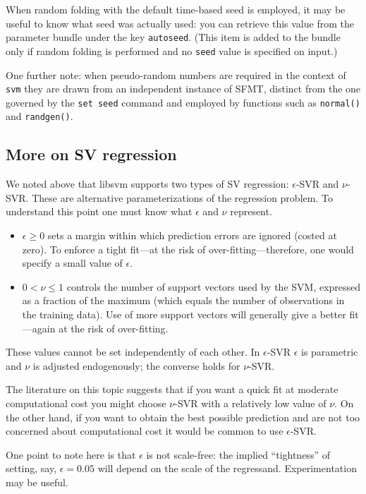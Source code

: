 \documentclass{article}
\begin{document}
When random folding with the default time-based seed is employed, it
may be useful to know what seed was actually used: you can retrieve
this value from the parameter bundle under the key
\texttt{autoseed}. (This item is added to the bundle only if random
folding is performed and no \texttt{seed} value is specified on
input.)

One further note: when pseudo-random numbers are required in the
context of \texttt{svm} they are drawn from an independent instance of
\textsf{SFMT}, distinct from the one governed by the \texttt{set seed}
command and employed by functions such as \texttt{normal()} and
\texttt{randgen()}.

\subsection{More on SV regression}
\label{sec:svr}

We noted above that libsvm supports two types of SV regression:
$\epsilon$-SVR and $\nu$-SVR. These are alternative parameterizations
of the regression problem. To understand this point one must know what
$\epsilon$ and $\nu$ represent.
\begin{itemize}
\item $\epsilon \geq 0$ sets a margin within which prediction errors
  are ignored (costed at zero). To enforce a tight fit---at the risk
  of over-fitting---therefore, one would specify a small value of
  $\epsilon$.
\item $0 < \nu \leq 1$ controls the number of support vectors used by
  the SVM, expressed as a fraction of the maximum (which equals the
  number of observations in the training data). Use of more support
  vectors will generally give a better fit---again at the risk of
  over-fitting.
\end{itemize}
These values cannot be set independently of each other. In
$\epsilon$-SVR $\epsilon$ is parametric and $\nu$ is adjusted
endogenously; the converse holds for $\nu$-SVR.

The literature on this topic suggests that if you want a quick fit at
moderate computational cost you might choose $\nu$-SVR with a
relatively low value of $\nu$. On the other hand, if you want to
obtain the best possible prediction and are not too concerned about
computational cost it would be common to use $\epsilon$-SVR.

One point to note here is that $\epsilon$ is not scale-free: the
implied ``tightness'' of setting, say, $\epsilon = 0.05$ will depend
on the scale of the regressand. Experimentation may be useful.
\end{document}
